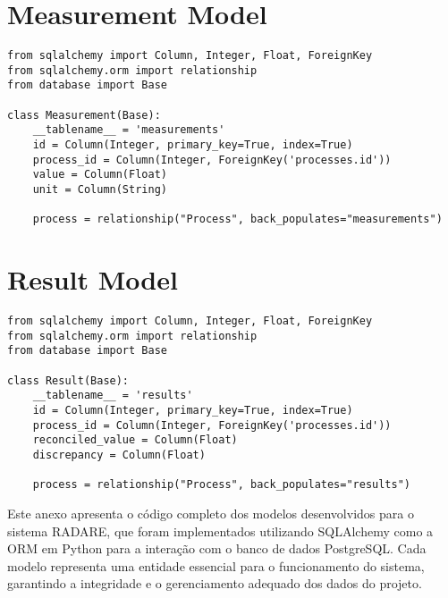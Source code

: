 \section*{Measurement Model}
\begin{verbatim}
from sqlalchemy import Column, Integer, Float, ForeignKey
from sqlalchemy.orm import relationship
from database import Base

class Measurement(Base):
    __tablename__ = 'measurements'
    id = Column(Integer, primary_key=True, index=True)
    process_id = Column(Integer, ForeignKey('processes.id'))
    value = Column(Float)
    unit = Column(String)

    process = relationship("Process", back_populates="measurements")
\end{verbatim}

\section*{Result Model}
\begin{verbatim}
from sqlalchemy import Column, Integer, Float, ForeignKey
from sqlalchemy.orm import relationship
from database import Base

class Result(Base):
    __tablename__ = 'results'
    id = Column(Integer, primary_key=True, index=True)
    process_id = Column(Integer, ForeignKey('processes.id'))
    reconciled_value = Column(Float)
    discrepancy = Column(Float)

    process = relationship("Process", back_populates="results")
\end{verbatim}

Este anexo apresenta o código completo dos modelos desenvolvidos para o sistema RADARE, que foram implementados utilizando SQLAlchemy como a ORM em Python para a interação com o banco de dados PostgreSQL. Cada modelo representa uma entidade essencial para o funcionamento do sistema, garantindo a integridade e o gerenciamento adequado dos dados do projeto.

\label{Anexo:frontCodeNodeTwoOne}

